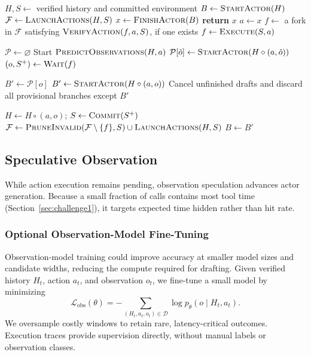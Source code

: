 \begin{algorithm}[t]
\caption{\sysname{}: Action--Observation Co-Speculation}
\label{alg:overview}
\small
\begin{algorithmic}[1]
\STATE $H,S\gets$ verified history and committed environment
\STATE $B\gets\textsc{StartActor}(H)$
\STATE $\mathcal F\gets\textsc{LaunchActions}(H,S)$
  \STATE $x\gets\textsc{FinishActor}(B)$
    \STATE \textbf{return} $x$
  \ENDIF
  \STATE $a\gets x$
  \STATE $f\gets$ a fork in $\mathcal F$ satisfying
         $\textsc{VerifyAction}(f,a,S)$, if one exists
    \STATE $f\gets\textsc{Execute}(S,a)$
  \ENDIF

  \STATE $\mathcal P\gets\varnothing$
    \STATE Start $\textsc{PredictObservations}(H,a)$
      \STATE $\mathcal P[\hat o]\gets
             \textsc{StartActor}(H\circ(a,\hat o))$
    \ENDFOR
  \ENDIF
  \STATE $(o,S^+)\gets\textsc{Wait}(f)$

    \STATE $B'\gets\mathcal P[o]$
  \ELSE
    \STATE $B'\gets\textsc{StartActor}(H\circ(a,o))$
  \ENDIF
  \STATE Cancel unfinished drafts and discard all provisional branches except $B'$

  \STATE $H\gets H\circ(a,o)$; $S\gets\textsc{Commit}(S^+)$
  \STATE $\mathcal F\gets
    \textsc{PruneInvalid}(\mathcal F\setminus\{f\},S)
    \cup\textsc{LaunchActions}(H,S)$
  \STATE $B\gets B'$
\ENDWHILE
\end{algorithmic}
\end{algorithm}

\subsection{Speculative Observation}
\label{subsec:evd}

While action execution remains pending, observation speculation advances actor
generation. Because a small fraction of calls contains most tool time
(Section~\ref{sec:challenge1}), it targets expected time hidden rather than hit rate.

\subsubsection{Optional Observation-Model Fine-Tuning}

Observation-model training could improve accuracy at smaller model sizes and candidate widths, reducing the compute required for drafting. 
Given verified history $H_t$,
action $a_t$, and observation $o_t$, we fine-tune a small model by minimizing
\begin{equation}
\mathcal{L}_{\mathrm{obs}}(\theta)
=
-\sum_{(H_t,a_t,o_t)\in\mathcal D}
\log p_\theta(o\mid H_t,a_t).
\end{equation}
We oversample costly windows to retain rare, latency-critical outcomes.
Execution traces provide supervision directly, without manual labels or
observation classes.

